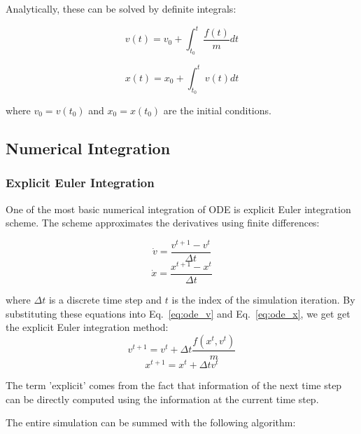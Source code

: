 \documentclass[en]{minipw} %
\begin{document}
Analytically, these can be solved by definite integrals:

\begin{equation}
\label{eq:ode_anal1}
v(t) = v_0 + \int_{t_0}^{t} \dfrac{f(t)}{m} dt
\end{equation}

\begin{equation}
\label{eq:ode_anal2}
x(t) = x_0 + \int_{t_0}^{t}v(t) dt
\end{equation}

where $v_0 = v(t_0)$ and $x_0 = x(t_0)$ are the initial conditions.

\subsection{Numerical Integration}

\subsubsection{Explicit Euler Integration}

One of the most basic numerical integration of ODE is explicit Euler integration scheme. The scheme approximates the derivatives using finite differences:

\begin{equation}
\dot{v} = \dfrac{v^{t+1} - v^{t}}{\Delta t}
\end{equation}
\begin{equation}
\dot{x} = \dfrac{x^{t+1} - x^{t}}{\Delta t}
\end{equation}

where $\Delta t$ is a discrete time step and $t$ is the index of the simulation iteration. By substituting these equations into Eq.~\ref{eq:ode_v} and Eq.~\ref{eq:ode_x}, we get get the explicit Euler integration method:
\begin{equation}
\label{eq:explicit_euler_ode_v}
v^{t+1} = v^{t} + \Delta t \dfrac{f(x^{t}, v^{t})}{m}
\end{equation}
\begin{equation}
\label{eq:explicit_euler_ode_x}
x^{t+1} = x^{t} + \Delta t v^{t}
\end{equation}

The term 'explicit' comes from the fact that information of the next time step can be directly computed using the information at the current time step.

The entire simulation can be summed with the following algorithm:
\end{document}
